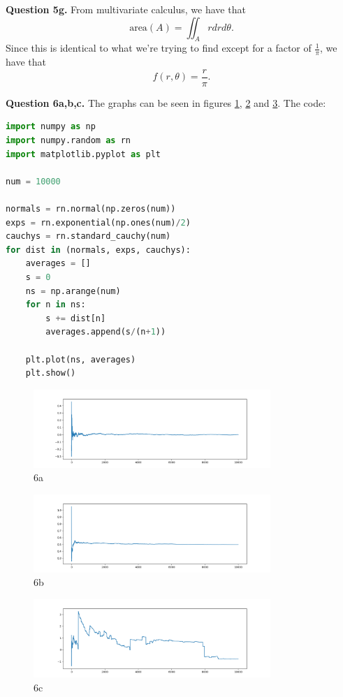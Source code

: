 \documentclass[letterpaper, reqno,11pt]{article}
\begin{document}
{\medskip\noindent\bf Question 5g.} From multivariate calculus, we have that 
\[
\text{area}(A)=\iint_A r drd\theta
.\]
Since this is identical to what we're trying to find except for a factor of $\frac{1}{\pi}$, we have that 
\[
f(r,\theta)=\frac{r}{\pi}
.\]

{\medskip\noindent\bf Question 6a,b,c.} The graphs can be seen in figures \ref{fig:6a}, \ref{fig:6b} and \ref{fig:6c}. The code:

\begin{lstlisting}[language=Python]
import numpy as np
import numpy.random as rn
import matplotlib.pyplot as plt

num = 10000

normals = rn.normal(np.zeros(num))
exps = rn.exponential(np.ones(num)/2)
cauchys = rn.standard_cauchy(num)
for dist in (normals, exps, cauchys):
    averages = []
    s = 0
    ns = np.arange(num)
    for n in ns:
        s += dist[n]
        averages.append(s/(n+1))

    plt.plot(ns, averages)
    plt.show()
\end{lstlisting}

\begin{figure}[htpb]
    \centering
    \includegraphics[width=0.8\textwidth]{6a}
    \caption{6a}
    \label{fig:6a}
\end{figure}

\begin{figure}[htpb]
    \centering
    \includegraphics[width=0.8\textwidth]{6b}
    \caption{6b}
    \label{fig:6b}
\end{figure}

\begin{figure}[htpb]
    \centering
    \includegraphics[width=0.8\textwidth]{6c}
    \caption{6c}
    \label{fig:6c}
\end{figure}
\end{document}
